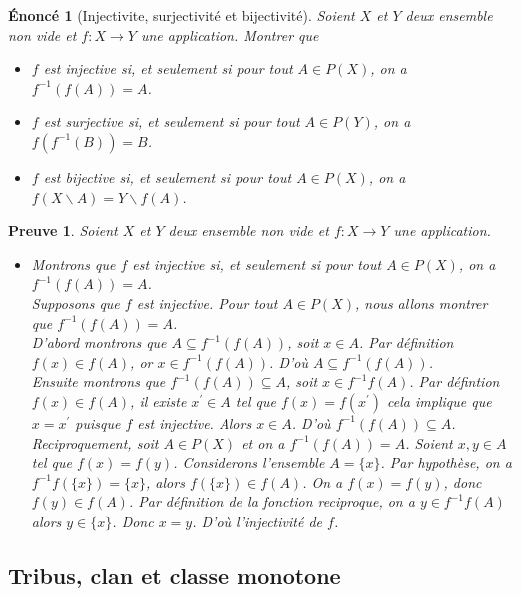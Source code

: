 \documentclass[a4paper, 12pt, french]{article}
\theoremstyle{break}
\newtheorem{enon}{Énoncé}[section]
\newtheorem{preuve}{Preuve}[section]
\begin{document}
\begin{enon}[Injectivite, surjectivité et bijectivité]
	Soient $X$ et $Y$ deux ensemble non vide et $f : X \rightarrow Y$ une application. Montrer que
	\begin{itemize}
		\item[a)] $f$ est injective si, et seulement si pour tout $A \in P(X)$, on a $f^{-1}(f(A)) = A$.
		\item[b)] $f$ est surjective si, et seulement si pour tout $A \in P(Y)$, on a $f(f^{-1}(B)) = B$.
		\item[a)] $f$ est bijective si, et seulement si pour tout $A \in P(X)$, on a $f(X \backslash A)=Y \backslash f(A)$.
	\end{itemize}
\end{enon}

\begin{preuve}
	Soient $X$ et $Y$ deux ensemble non vide et $f : X \rightarrow Y$ une application.
	\begin{itemize}
		\item[a)] Montrons que $f$ est injective si, et seulement si pour tout $A \in P(X)$, on a $f^{-1}(f(A)) = A$.\\
		Supposons que $f$ est injective. Pour tout $A \in P(X)$, nous allons montrer que $f^{-1}(f(A)) = A$.\\
		D'abord montrons que $A \subseteq f^{-1}(f(A))$, soit $x \in A$. Par définition $f(x) \in f(A)$, or $x \in f^{-1}(f(A))$. D'où $A \subseteq f^{-1}(f(A))$.\\ Ensuite montrons que $f^{-1}(f(A)) \subseteq A$, soit $x \in f^{-1}f(A)$. Par défintion $f(x) \in f(A)$, il existe $x^{'} \in A$ tel que $f(x)=f(x^{'})$ cela implique que $x = x^{'}$ puisque $f$ est injective. Alors $x \in A$. D'où $f^{-1}(f(A)) \subseteq A$.\\ Reciproquement, soit $A \in P(X)$ et on a $f^{-1}(f(A)) = A$. Soient $x,y \in A$ tel que $f(x)=f(y)$. Considerons l'ensemble $A=\{x\}$. Par hypothèse, on a $f^{-1}f(\{x\})=\{x\}$, alors $f(\{x\}) \in f(A)$. On a $f(x)=f(y)$, donc $f(y) \in f(A)$. Par définition de la fonction reciproque, on a $y \in f^{-1}f(A)$ alors $y \in \{x\}$. Donc $x=y$. D'où l'injectivité de $f$. \marginpar{$\square$} 
	\end{itemize}
\end{preuve}

\begin{center}\section{Tribus, clan et classe monotone}\end{center}
\end{document}
